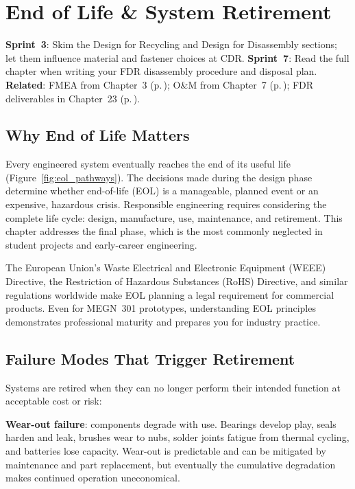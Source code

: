 \chapter{End of Life \& System Retirement}\label{ch:eol}

\begin{tipbox}
\textbf{Sprint~3}: Skim the Design for Recycling and Design for Disassembly sections; let them influence material and fastener choices at CDR. \textbf{Sprint~7}: Read the full chapter when writing your FDR disassembly procedure and disposal plan. \textbf{Related}: FMEA from Chapter~3 (p.\,\pageref{ch:requirements}); O\&M from Chapter~7 (p.\,\pageref{ch:oandm}); FDR deliverables in Chapter~23 (p.\,\pageref{ch:fdr}).
\end{tipbox}

\section{Why End of Life Matters}



Every engineered system eventually reaches the end of its useful life (Figure~\ref{fig:eol_pathways}). The decisions made during the design phase determine whether end-of-life (EOL) is a manageable, planned event or an expensive, hazardous crisis. Responsible engineering requires considering the complete life cycle: design, manufacture, use, maintenance, and retirement. This chapter addresses the final phase, which is the most commonly neglected in student projects and early-career engineering.

The European Union's Waste Electrical and Electronic Equipment (WEEE) Directive, the Restriction of Hazardous Substances (RoHS) Directive, and similar regulations worldwide make EOL planning a legal requirement for commercial products. Even for MEGN~301 prototypes, understanding EOL principles demonstrates professional maturity and prepares you for industry practice.

\section{Failure Modes That Trigger Retirement}
Systems are retired when they can no longer perform their intended function at acceptable cost or risk:

\textbf{Wear-out failure}: components degrade with use. Bearings develop play, seals harden and leak, brushes wear to nubs, solder joints fatigue from thermal cycling, and batteries lose capacity. Wear-out is predictable and can be mitigated by maintenance and part replacement, but eventually the cumulative degradation makes continued operation uneconomical.

